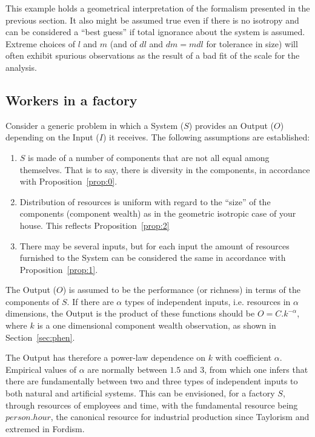 \documentclass[a4paper, 11pt]{article} %
\begin{document}
This example holds a geometrical
interpretation of the formalism presented in the previous section.
It also might be assumed true even if there is no isotropy
and can be considered a ``best guess'' if total ignorance
about the system is assumed. 
Extreme choices of $l$ and $m$ (and of $dl$ and $dm=mdl$ for tolerance in size)
will often exhibit spurious observations
as the result of a bad fit of the scale for the analysis.

\subsection{Workers in a factory}
Consider a generic problem in which a System ($S$) provides an Output ($O$) depending on the Input ($I$) it receives.
The following assumptions are established:
\begin{enumerate}
	\item $S$ is made of a number of components that are not all equal among themselves.
That is to say, there is diversity in the components, in accordance with Proposition~\ref{prop:0}. 
\item Distribution of resources is uniform with regard to the ``size'' of the components (component wealth) as in the geometric isotropic case of your house.
This reflects Proposition~\ref{prop:2}
\item There may be several inputs, but for each input the amount of resources furnished to the System can be considered the same 
	in accordance with Proposition~\ref{prop:1}.
\end{enumerate}

The Output ($O$)
is assumed to be the performance (or richness) in terms of the components of $S$.
If there are $\alpha$ types of independent inputs, i.e. resources in $\alpha$ dimensions,
the Output is the product of these functions should be
$O =C.k^{-\alpha}$, where $k$ is a one dimensional component wealth observation,
as shown in Section~\ref{sec:phen}. 

The Output has therefore a power-law dependence on $k$ with coefficient $\alpha$. 
Empirical values of $\alpha$
are normally between $1.5$ and $3$,
from which one infers that there are 
fundamentally between two and three types
of independent inputs to both natural and artificial systems.
This can be envisioned, for a factory $S$, through resources
of employees and time, with the fundamental resource being 
$person . hour$, the canonical resource for 
industrial production since Taylorism
and extremed in Fordism.
\end{document}
